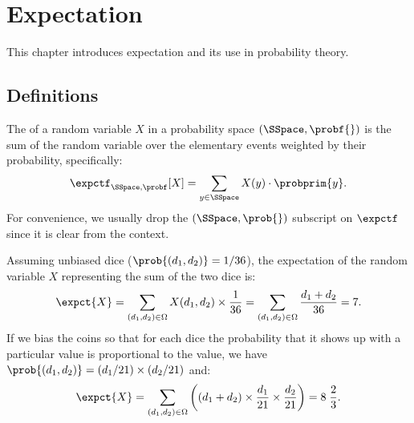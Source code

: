 \chapter{Expectation}
\label{ch:probability::expectation}

\begin{preamble}
This chapter introduces expectation and its use in probability theory.
\end{preamble}

\section{Definitions}

\begin{flex}
\begin{gram}  
  The  of a random variable $X$ in a probability space
  $(\SSpace,\probf{})$ is the sum of the random variable over the
elementary events weighted by their probability, specifically:
\[
\expctf_{\SSpace,\probf}[X] = \sum_{y \in \SSpace} X(y) \cdot
\probprim{y}.
\] 
%
For convenience, we  usually drop the $(\SSpace,\prob{})$
subscript on $\expctf$ since it is clear from the context.
\end{gram}

\begin{example}
\label{ex:probability::expectation::dice}
Assuming unbiased dice ($\prob{(d_1,d_2)} = 1/36$), the expectation of
  the random variable $X$ representing the sum of the two dice is:
\[ 
\expct{X} = \sum_{(d_1,d_2) \in \Omega} X(d_1,d_2)
\times \frac{1}{36} = \sum_{(d_1,d_2) \in \Omega} \frac{d_1+d_2}{36} =
7.
\]
If we bias the coins so that for each dice the probability that it
shows up with a particular value is proportional to the value, we
have $\prob{(d_1,d_2)} = (d_1/21) \times (d_2/21)$ and:
\[ 
\expct{X} = \sum_{(d_1,d_2) \in \Omega} \left((d_1+d_2) \times \frac{d_1}{21}\times\frac{d_2}{21}\right) = 8\; \frac{2}{3}.\]
\end{example}
\end{flex}
